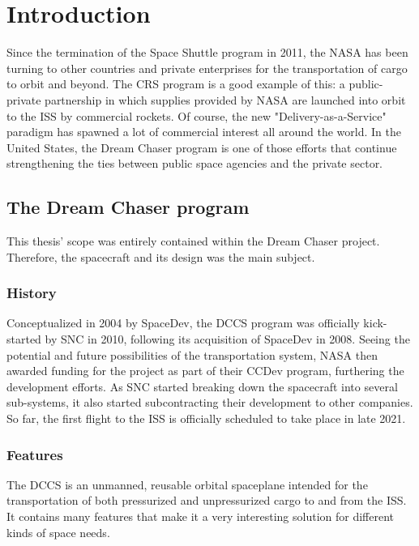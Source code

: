 \setlength{\parindent}{2em}
\chapter{Introduction}\label{cha:intro}
Since the termination of the Space Shuttle program in 2011, the \gls{NASA} has been turning to other countries and private enterprises for the transportation of cargo to orbit and beyond. The \gls{CRS} program is a good example of this: a public-private partnership in which supplies provided by NASA are launched into orbit to the \gls{ISS} by commercial rockets. Of course, the new "Delivery-as-a-Service" paradigm has spawned a lot of commercial interest all around the world. In the United States, the Dream Chaser program is one of those efforts that continue strengthening the ties between public space agencies and the private sector.

\section{The Dream Chaser program}
This thesis' scope was entirely contained within the Dream Chaser project. Therefore, the spacecraft and its design was the main subject. 
\subsection*{History}
Conceptualized in 2004 by SpaceDev, the \gls{DCCS} program was officially kick-started by \gls{SNC} in 2010, following its acquisition of SpaceDev in 2008\cite{online:fikes}. Seeing the potential and future possibilities of the transportation system, NASA then awarded funding for the project as part of their \gls{CCDev} program, furthering the development efforts. As \gls{SNC} started breaking down the spacecraft into several sub-systems, it also started subcontracting their development to other companies. So far, the first flight to the \gls{ISS} is officially scheduled to take place in late 2021\cite{online:kanayama}.

\subsection*{Features}
The \gls{DCCS} is an unmanned, reusable orbital spaceplane intended for the transportation of both pressurized and unpressurized cargo to and from the \gls{ISS}. It contains many features that make it a very interesting solution for different kinds of space needs. 

